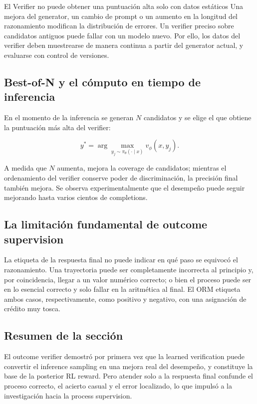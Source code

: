 \documentclass[a4paper]{article}
\begin{document}
\begin{warningbox}{El Verifier no puede obtener una puntuación alta solo con datos estáticos}
Una mejora del generator, un cambio de prompt o un aumento en la longitud del razonamiento modifican la distribución de errores. Un verifier preciso sobre candidatos antiguos puede fallar con un modelo nuevo. Por ello, los datos del verifier deben muestrearse de manera continua a partir del generator actual, y evaluarse con control de versiones.
\end{warningbox}

\subsection{Best-of-N y el cómputo en tiempo de inferencia}

En el momento de la inferencia se generan $N$ candidatos y se elige el que obtiene la puntuación más alta del verifier:

$$
y^*=\arg\max_{y_j\sim\pi_\theta(\cdot\mid x)} v_\phi(x,y_j).
$$

A medida que $N$ aumenta, mejora la coverage de candidatos; mientras el ordenamiento del verifier conserve poder de discriminación, la precisión final también mejora. Se observa experimentalmente que el desempeño puede seguir mejorando hasta varios cientos de completions.


\subsection{La limitación fundamental de outcome supervision}

La etiqueta de la respuesta final no puede indicar en qué paso se equivocó el razonamiento. Una trayectoria puede ser completamente incorrecta al principio y, por coincidencia, llegar a un valor numérico correcto; o bien el proceso puede ser en lo esencial correcto y solo fallar en la aritmética al final. El ORM etiqueta ambos casos, respectivamente, como positivo y negativo, con una asignación de crédito muy tosca.

\subsection{Resumen de la sección}

El outcome verifier demostró por primera vez que la learned verification puede convertir el inference sampling en una mejora real del desempeño, y constituye la base de la posterior RL reward. Pero atender solo a la respuesta final confunde el proceso correcto, el acierto casual y el error localizado, lo que impulsó a la investigación hacia la process supervision.
\end{document}
